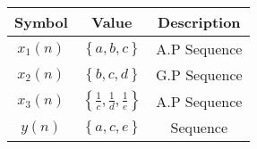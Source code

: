 \begin{tabular}{|c|c|c|}
    \hline
     \textbf{Symbol} & \textbf{Value} &
     \textbf{Description} \\
    \hline
     $x_1(n)$ & $\left\{a,b,c\right\}$ & A.P Sequence\\[6pt]
    \hline
     $x_2(n)$ & $\left\{b,c,d\right\}$ & G.P Sequence\\[6pt]
    \hline
     $x_3(n)$ & $\left\{\frac{1}{c}, \frac{1}{d}, \frac{1}{e}\right\}$
 &  A.P Sequence\\[6pt]
    \hline
     $y(n)$   & $\left\{a,c,e\right\}$  & Sequence\\[6pt]
    \hline
\end{tabular}

